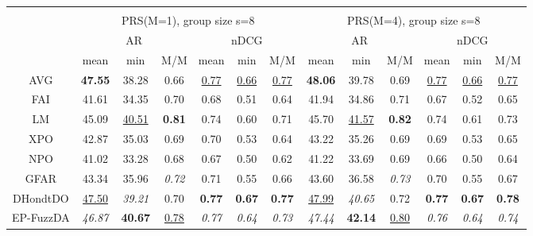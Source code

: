 \begin{tabular}{ c | c c c | c c c || c c c | c c c}
\multicolumn{12}{c}{} \\
\multicolumn{1}{c}{} & \multicolumn{6}{c}{PRS(M=1), group size s=8} & \multicolumn{6}{c}{PRS(M=4), group size s=8} \\
\multicolumn{1}{c}{} & \multicolumn{3}{c}{AR} & \multicolumn{3}{c}{nDCG} & \multicolumn{3}{c}{AR} & \multicolumn{3}{c}{nDCG} \\
& mean & min & M/M & mean & min & M/M & mean & min & M/M & mean & min & M/M \\
\hline
AVG & \textbf{47.55} & 38.28 & 0.66 & \underline{0.77} & \underline{0.66} & \underline{0.77} & \textbf{48.06} & 39.78 & 0.69 & \underline{0.77} & \underline{0.66} & \underline{0.77} \\
FAI & 41.61 & 34.35 & 0.70 & 0.68 & 0.51 & 0.64 & 41.94 & 34.86 & 0.71 & 0.67 & 0.52 & 0.65 \\
LM & 45.09 & \underline{40.51} & \textbf{0.81} & 0.74 & 0.60 & 0.71 & 45.70 & \underline{41.57} & \textbf{0.82} & 0.74 & 0.61 & 0.73 \\
XPO & 42.87 & 35.03 & 0.69 & 0.70 & 0.53 & 0.64 & 43.22 & 35.26 & 0.69 & 0.69 & 0.53 & 0.65 \\
NPO & 41.02 & 33.28 & 0.68 & 0.67 & 0.50 & 0.62 & 41.22 & 33.69 & 0.69 & 0.66 & 0.50 & 0.64 \\
GFAR & 43.34 & 35.96 & \textit{0.72} & 0.71 & 0.55 & 0.66 & 43.60 & 36.58 & \textit{0.73} & 0.70 & 0.55 & 0.67 \\
DHondtDO & \underline{47.50} & \textit{39.21} & 0.70 & \textbf{0.77} & \textbf{0.67} & \textbf{0.77} & \underline{47.99} & \textit{40.65} & 0.72 & \textbf{0.77} & \textbf{0.67} & \textbf{0.78} \\
EP-FuzzDA & \textit{46.87} & \textbf{40.67} & \underline{0.78} & \textit{0.77} & \textit{0.64} & \textit{0.73} & \textit{47.44} & \textbf{42.14} & \underline{0.80} & \textit{0.76} & \textit{0.64} & \textit{0.74} \\

\end{tabular}
